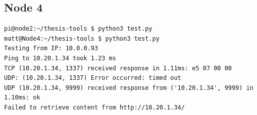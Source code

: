 \subsection*{Node 4}
\begin{lstlisting}[style=consoleoutput]pi@node2:~/thesis-tools $ python3 test.py
matt@Node4:~/thesis-tools $ python3 test.py
Testing from IP: 10.0.0.93
Ping to 10.20.1.34 took 1.23 ms
TCP (10.20.1.34, 1337) received response in 1.11ms: e5 07 00 00
UDP: (10.20.1.34, 1337) Error occurred: timed out
UDP (10.20.1.34, 9999) received response from ('10.20.1.34', 9999) in 1.10ms: ok
Failed to retrieve content from http://10.20.1.34/
\end{lstlisting}



